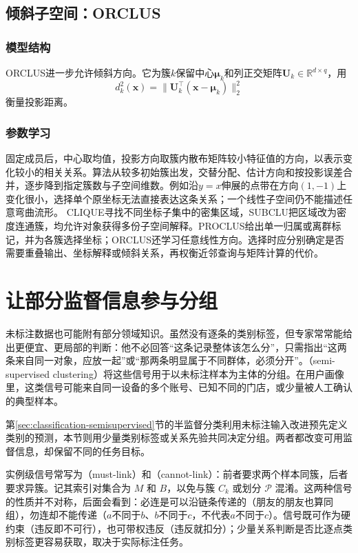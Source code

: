 \subsection{倾斜子空间：ORCLUS}

\subsubsection{模型结构}

ORCLUS进一步允许倾斜方向。它为簇$k$保留中心$\bm\mu_k$和列正交矩阵$\bm U_k\in\mathbb R^{d\times q}$，用
\[
 d_k^2(\bm x)=\lVert\bm U_k^\top(\bm x-\bm\mu_k)\rVert_2^2
\]
衡量投影距离。

\subsubsection{参数学习}

固定成员后，中心取均值，投影方向取簇内散布矩阵较小特征值的方向，以表示变化较小的相关关系。算法从较多初始簇出发，交替分配、估计方向和按投影误差合并，逐步降到指定簇数与子空间维数。例如沿$y=x$伸展的点带在方向$(1,-1)$上变化很小，选择单个原坐标无法直接表达这条关系；一个线性子空间仍不能描述任意弯曲流形。
CLIQUE寻找不同坐标子集中的密集区域，SUBCLU把区域改为密度连通簇，均允许对象获得多份子空间解释。PROCLUS给出单一归属或离群标记，并为各簇选择坐标；ORCLUS还学习任意线性方向。选择时应分别确定是否需要重叠输出、坐标解释或倾斜关系，再权衡近邻查询与矩阵计算的代价。
\section{让部分监督信息参与分组}
\label{sec:clustering-semisupervised}

未标注数据也可能附有部分领域知识。虽然没有逐条的类别标签，但专家常常能给出更便宜、更局部的判断：他不必回答“这条记录整体该怎么分”，只需指出“这两条来自同一对象，应放一起”或“那两条明显属于不同群体，必须分开”。（semi-supervised clustering）将这些信号用于以未标注样本为主体的分组。在用户画像里，这类信号可能来自同一设备的多个账号、已知不同的门店，或少量被人工确认的典型样本。

第\ref{sec:classification-semisupervised}节的半监督分类利用未标注输入改进预先定义类别的预测，本节则用少量类别标签或关系先验共同决定分组。两者都改变可用监督信息，却保留不同的任务目标。

实例级信号常写为（must-link）和（cannot-link）：前者要求两个样本同簇，后者要求异簇。记其索引对集合为 $M$ 和 $B$，以免与簇 $C_k$ 或划分 $\mathcal{P}$ 混淆。这两种信号的性质并不对称，后面会看到：必连是可以沿链条传递的（朋友的朋友也算同组），勿连却不能传递（$a$不同于$b$、$b$不同于$c$，不代表$a$不同于$c$）。信号既可作为硬约束（违反即不可行），也可带权违反（违反就扣分）；少量关系判断是否比逐点类别标签更容易获取，取决于实际标注任务。


